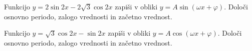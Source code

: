 \documentclass[a4paper,12pt]{letter}
\newcounter{tocke}
\begin{document}
\begin{naloga}[\hfill $\tockeE$] \addtocounter{tocke}{\numexpr\tockeE\relax}
Funkcijo $\displaystyle y=2\sin2x-2\sqrt3\cos2x$ zapi\v{s}i v obliki $y=A\sin(\omega x+\varphi)$. Dolo\v{c}i osnovno periodo, zalogo vrednosti in za\v{c}etno vrednost.
\vspace{4cm}
\end{naloga}

\begin{naloga}[\hfill $\tockeF$] \addtocounter{tocke}{\numexpr\tockeF\relax}
Funkcijo $\displaystyle y=\sqrt3\cos2x-\sin2x$ zapi\v{s}i v obliki $y=A\cos(\omega x+\varphi)$. Dolo\v{c}i osnovno periodo, zalogo vrednosti in za\v{c}etno vrednost.
\vspace{4cm}
\end{naloga}
\end{document}
